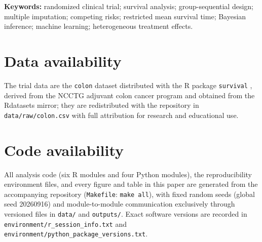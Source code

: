 \documentclass[11pt,a4paper]{article}
\begin{document}
\vspace{0.4em}
\noindent\textbf{Keywords:} randomized clinical trial; survival analysis;
group-sequential design; multiple imputation; competing risks; restricted
mean survival time; Bayesian inference; machine learning; heterogeneous
treatment effects.

\vspace{1.2em}






\section*{Data availability}
The trial data are the \texttt{colon} dataset distributed with the R
package \texttt{survival} \citep{therneau2026}, derived from the NCCTG
adjuvant colon cancer program \citep{laurie1989,moertel1990} and obtained
from the Rdatasets mirror; they are redistributed with the repository in
\texttt{data/raw/colon.csv} with full attribution for research and
educational use.

\section*{Code availability}
All analysis code (six R modules and four Python modules), the
reproducibility environment files, and every figure and table in this
paper are generated from the accompanying repository
(\texttt{Makefile}: \texttt{make all}), with fixed random seeds
(global seed 20260916) and module-to-module communication exclusively
through versioned files in \texttt{data/} and \texttt{outputs/}.
Exact software versions are recorded in
\texttt{environment/r\_session\_info.txt} and
\texttt{environment/python\_package\_versions.txt}.



\end{document}
